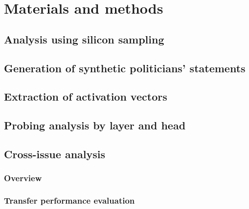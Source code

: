 \documentclass[10pt,letterpaper]{article}
\begin{document}
\section*{Materials and methods}


\subsection*{Analysis using silicon sampling}
\label{sec:baseline}


\subsection*{Generation of synthetic politicians' statements}
\label{sec:data_generation}


\subsection*{Extraction of activation vectors}
\label{sec:activation}


\subsection*{Probing analysis by layer and head}
\label{sec:probing}


\subsection*{Cross-issue analysis}
\label{sec:cross_theme}

\subsubsection*{Overview}
\label{sec:cross_theme_purpose}

\subsubsection*{Transfer performance evaluation}
\label{sec:transfer}
\end{document}
